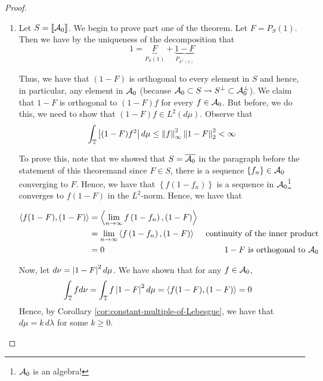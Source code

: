 \begin{proof}
    \begin{enumerate}
	\item Let $S=\llbracket {\cal A} _{0} \rrbracket$. We begin to prove part one of the theorem. Let $F= P_{S} \left( 1 \right)$. Then we have by the uniqueness of the decomposition that
    \begin{equation*}
	1=\underbrace{F}_{P_S (1)} + \underbrace{1-F}_{P_{S^{\perp} (1)}}
    \end{equation*}

    Thus, we have that $\left( 1-F \right)$ is orthogonal to every element in $S$ and hence, in particular, any element in ${\cal A} _{0}$ (because ${\cal A}_{0} \subset S \leadsto S^{\perp} \subset {\cal A}_{0} ^{\perp}$). We claim that $1-F$ is orthogonal to $\left( 1-F \right) f $ for every $f\in {\cal A} _{0}$.  But before, we do this, we need to show that $(1-F)f \in L^{2} (d\mu)$. Observe that\begin{align*}
	\int_{\mathbb T} \left\lvert (1-F)f^{2} \right\rvert d\mu \le \left\lVert f \right\rVert_{\infty}^{2} \left\lVert 1-F \right\rVert_{2}^{2} < \infty
    \end{align*}

    To prove this, note that we showed that $S=\overline{{\cal A}_{0}}$ in the paragraph before the statement of this theoremand since $F \in S$, there is a sequence $\left\{ f_{n} \right\} \in {\cal A} _{0}$ converging to $F$. Hence, we have that $\left\{ f\left( 1-f_{n} \right) \right\}$ is a sequence in ${\cal A} _{0}$\footnote{${\cal A}_{0}$ is an algebra!} converges to $f\left( 1-F \right)$ in the $L^{2}$-norm. Hence, we have that

    \begin{align*}
	\left\langle f(1-F), (1-F) \right\rangle &= \left\langle \lim_{n\to \infty} f\left( 1-f_{n} \right), \left( 1-F \right) \right\rangle \\
	&= \lim_{n\to \infty} \left\langle f\left( 1-f_{n} \right), \left( 1-F \right) \right\rangle &\text{continuity of the inner product} \\
	&= 0  & \text{$1-F$ is orthogonal to ${\cal A}_{0}$}
    \end{align*}
     
    Now, let $d\nu = \left\lvert 1-F \right\rvert^{2} d\mu$. We have shown that for any $f\in {\cal A}_{0}$, 
    \begin{align*}
	\int_{\mathbb T} f d\nu &= \int_{\mathbb T} f \left\lvert 1-F \right\rvert^{2} d\mu = \left\langle f(1-F), (1-F) \right\rangle = 0
    \end{align*}
    Hence, by Corollary \ref{cor:constant-multiple-of-Lebesgue}, we have that $d\mu = k\, d\lambda$ for some $k \ge 0$.


\end{enumerate}
\end{proof}
